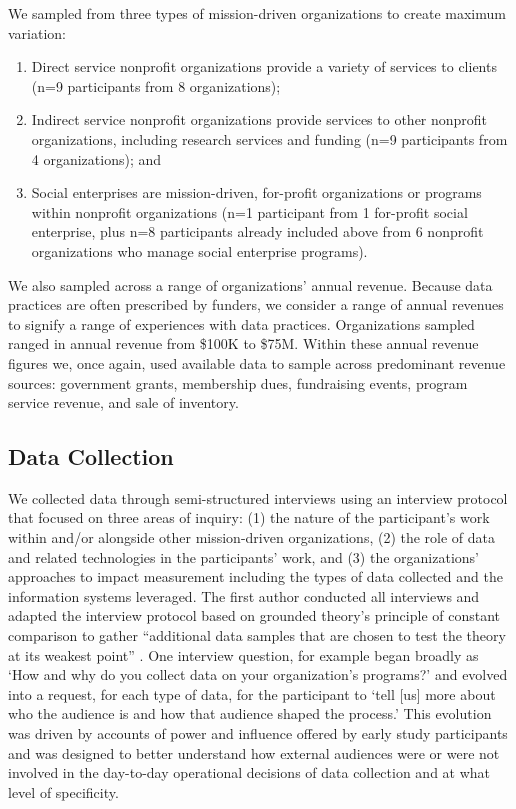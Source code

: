 We sampled from three types of mission-driven organizations to create maximum variation:

\begin{enumerate}
\item Direct service nonprofit organizations provide a variety of services to clients (n=9 participants from 8 organizations);
\item Indirect service nonprofit organizations provide services to other nonprofit organizations, including research services and funding (n=9 participants from 4 organizations); and
\item Social enterprises are mission-driven, for-profit organizations or programs within nonprofit organizations (n=1 participant from 1 for-profit social enterprise, plus n=8 participants already included above from 6 nonprofit organizations who manage social enterprise programs).
\end{enumerate}

We also sampled across a range of organizations’ annual revenue. Because data practices are often prescribed by funders, we consider a range of annual revenues to signify a range of experiences with data practices. Organizations sampled ranged in annual revenue from \$100K to \$75M. Within these annual revenue figures we, once again, used available data to sample across predominant revenue sources: government grants, membership dues, fundraising events, program service revenue, and sale of inventory.

\subsection{Data Collection}
We collected data through semi-structured interviews using an interview protocol that focused on three areas of inquiry: (1) the nature of the participant’s work within and/or alongside other mission-driven organizations, (2) the role of data and related technologies in the participants’ work, and (3) the organizations’ approaches to impact measurement including the types of data collected and the information systems leveraged. The first author conducted all interviews and adapted the interview protocol based on grounded theory’s principle of constant comparison to gather “additional data samples that are chosen to test the theory at its weakest point” \citep{Muller2014Grounded}. One interview question, for example began broadly as ‘How and why do you collect data on your organization’s programs?’ and evolved into a request, for each type of data, for the participant to ‘tell [us] more about who the audience is and how that audience shaped the process.’ This evolution was driven by accounts of power and influence offered by early study participants and was designed to better understand how external audiences were or were not involved in the day-to-day operational decisions of data collection and at what level of specificity.

